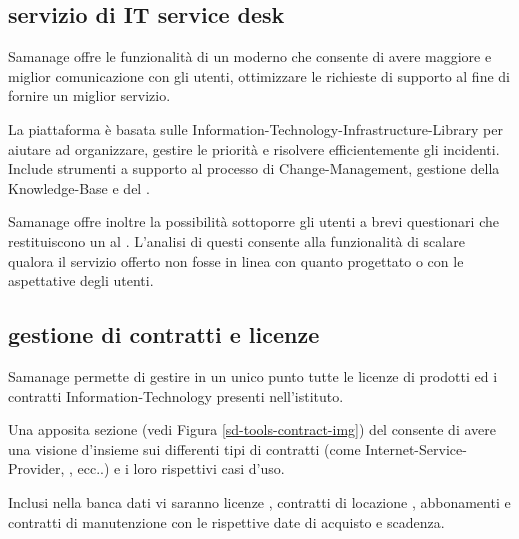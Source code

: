 \subsection[Servizio di IT Service Desk]{servizio di IT service desk}
\label{sd-tools-service-desk}
Samanage offre le funzionalità di un moderno  che consente di avere maggiore e miglior comunicazione con gli utenti, ottimizzare le richieste di supporto al fine di fornire un miglior servizio.

La piattaforma è basata sulle  \ac{Information-Technology-Infrastructure-Library} per aiutare ad organizzare, gestire le priorità e risolvere efficientemente gli incidenti. Include strumenti a supporto al processo di \ac{Change-Management}, gestione della \ac{Knowledge-Base} e del .

Samanage offre inoltre la possibilità sottoporre gli utenti a brevi questionari che restituiscono un  al . L'analisi di questi  consente alla funzionalità di scalare qualora il servizio offerto non fosse in linea con quanto progettato o con le aspettative degli utenti.

\subsection[Gestione di contratti e e licenze]{gestione di contratti e licenze}
\label{sd-tools-contract}
Samanage permette di gestire in un unico punto tutte le licenze di prodotti ed i contratti \acs{Information-Technology} presenti nell'istituto.

Una apposita sezione (vedi Figura \ref{sd-tools-contract-img}) del  consente di avere una visione d'insieme sui differenti tipi di contratti (come \acs{Internet-Service-Provider}, , ecc..) e i loro rispettivi casi d'uso.

Inclusi nella banca dati vi saranno licenze , contratti di locazione , abbonamenti e contratti di manutenzione con le rispettive date di acquisto e scadenza.


